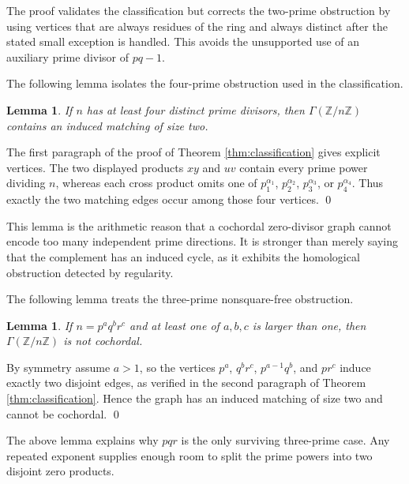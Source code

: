 \documentclass[12pt]{article}
\newtheorem{lemma}[theorem]{Lemma}
\theoremstyle{definition}
\renewenvironment{proof}{{\bf \noindent Proof.}}{\qed}
\begin{document}
\medskip

The proof validates the classification but corrects the two-prime obstruction by using vertices that are always residues of the ring and always distinct after the stated small exception is handled.  This avoids the unsupported use of an auxiliary prime divisor of $pq-1$.

\medskip

\noindent The following lemma isolates the four-prime obstruction used in the classification.
\begin{lemma}\label{lem:four-prime}
If $n$ has at least four distinct prime divisors, then $\Gamma(\mathbb{Z}/n\mathbb{Z})$ contains an induced matching of size two.
\end{lemma}

\begin{proof}
The first paragraph of the proof of Theorem \ref{thm:classification} gives explicit vertices.  The two displayed products $xy$ and $uv$ contain every prime power dividing $n$, whereas each cross product omits one of $p_1^{\alpha_1}$, $p_2^{\alpha_2}$, $p_3^{\alpha_3}$, or $p_4^{\alpha_4}$.  Thus exactly the two matching edges occur among those four vertices.
\end{proof}

\medskip

This lemma is the arithmetic reason that a cochordal zero-divisor graph cannot encode too many independent prime directions.  It is stronger than merely saying that the complement has an induced cycle, as it exhibits the homological obstruction detected by regularity.

\medskip

\noindent The following lemma treats the three-prime nonsquare-free obstruction.
\begin{lemma}\label{lem:three-prime-obstruction}
If $n=p^a q^b r^c$ and at least one of $a,b,c$ is larger than one, then $\Gamma(\mathbb{Z}/n\mathbb{Z})$ is not cochordal.
\end{lemma}

\begin{proof}
By symmetry assume $a>1$, so the vertices $p^a$, $q^b r^c$, $p^{a-1}q^b$, and $pr^c$ induce exactly two disjoint edges, as verified in the second paragraph of Theorem \ref{thm:classification}.  Hence the graph has an induced matching of size two and cannot be cochordal.
\end{proof}

\medskip

The above lemma explains why $pqr$ is the only surviving three-prime case.  Any repeated exponent supplies enough room to split the prime powers into two disjoint zero products.
\end{document}
